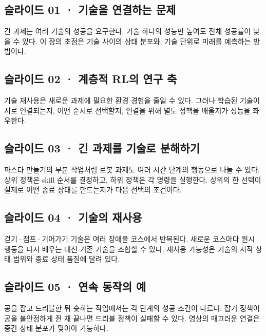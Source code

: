 \documentclass[11pt,a4paper]{article}
\begin{document}
\subsection{슬라이드 01 · 기술을 연결하는 문제}

긴 과제는 여러 기술의 성공을 요구한다. 기술 하나의 성능만 높여도 전체 성공률이 낮을 수 있다. 이 장의 초점은 기술 사이의 상태 분포와, 기술 단위로 미래를 예측하는 방법이다.\par

\subsection{슬라이드 02 · 계층적 RL의 연구 축}

기술 재사용은 새로운 과제에 필요한 환경 경험을 줄일 수 있다. 그러나 학습된 기술이 서로 연결되는지, 어떤 순서로 선택할지, 연결을 위해 별도 정책을 배울지가 성능을 좌우한다.\par

\subsection{슬라이드 03 · 긴 과제를 기술로 분해하기}

파스타 만들기의 부분 작업처럼 로봇 과제도 여러 시간 단계의 행동으로 나눌 수 있다. 상위 정책은 skill 순서를 결정하고, 하위 정책은 각 명령을 실행한다. 상위의 한 선택이 실제로 어떤 종료 상태를 만드는지가 다음 선택의 조건이다.\par

\subsection{슬라이드 04 · 기술의 재사용}

걷기·점프·기어가기 기술은 여러 장애물 코스에서 반복된다. 새로운 코스마다 원시 행동을 다시 배우는 대신 기존 기술을 조합할 수 있다. 재사용 가능성은 기술의 시작 상태 범위와 종료 상태 품질에 달려 있다.\par

\subsection{슬라이드 05 · 연속 동작의 예}

공을 잡고 드리블한 뒤 슛하는 작업에서는 각 단계의 성공 조건이 다르다. 잡기 정책이 공을 불안정하게 쥔 채 끝나면 드리블 정책이 실패할 수 있다. 영상의 매끄러운 연결은 중간 상태 분포가 맞아야 가능하다.\par
\end{document}

